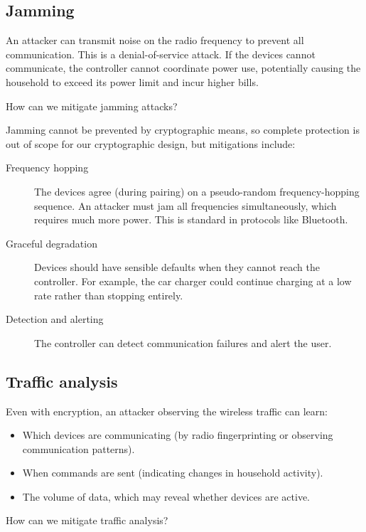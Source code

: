 \subsection{Jamming}

An attacker can transmit noise on the radio frequency to prevent all
communication.
This is a denial-of-service attack.
If the devices cannot communicate, the controller cannot coordinate
power use, potentially causing the household to exceed its power limit
and incur higher bills.

\begin{exercise}
  How can we mitigate jamming attacks?
\end{exercise}

Jamming cannot be prevented by cryptographic means, so complete protection
is out of scope for our cryptographic design, but mitigations include:
\begin{description}
  \item[Frequency hopping] The devices agree (during pairing) on a
    pseudo-random frequency-hopping sequence.
    An attacker must jam all frequencies simultaneously, which requires
    much more power.
    This is standard in protocols like Bluetooth.
  \item[Graceful degradation] Devices should have sensible defaults when
    they cannot reach the controller.
    For example, the car charger could continue charging at a low rate
    rather than stopping entirely.
  \item[Detection and alerting] The controller can detect communication
    failures and alert the user.
\end{description}

\subsection{Traffic analysis}

Even with encryption, an attacker observing the wireless traffic can learn:
\begin{itemize}
  \item Which devices are communicating (by radio fingerprinting or
    observing communication patterns).
  \item When commands are sent (indicating changes in household activity).
  \item The volume of data, which may reveal whether devices are active.
\end{itemize}

\begin{exercise}
  How can we mitigate traffic analysis?
\end{exercise}

